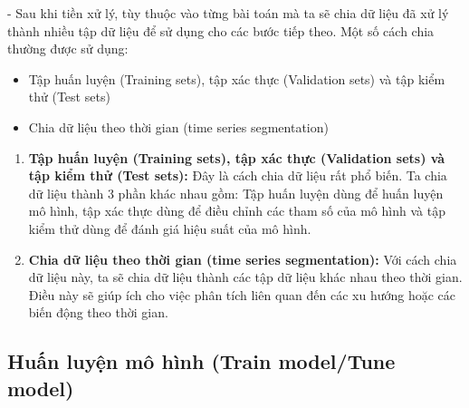 - Sau khi tiền xử lý, tùy thuộc vào từng bài toán mà ta sẽ chia dữ liệu đã xử lý thành nhiều tập dữ liệu để sử dụng cho các bước tiếp theo. Một số cách chia thường được sử dụng:
\begin{itemize}
    \item Tập huấn luyện (Training sets), tập xác thực (Validation sets) và tập kiểm thử (Test sets)
    \item Chia dữ liệu theo thời gian (time series segmentation)
\end{itemize}
\begin{enumerate}
    \item \textbf{Tập huấn luyện (Training sets), tập xác thực (Validation sets) và tập kiểm thử (Test sets):} Đây là cách chia dữ liệu rất phổ biến. Ta chia dữ liệu thành 3 phần khác nhau gồm: Tập huấn luyện dùng để huấn luyện mô hình, tập xác thực dùng để điều chỉnh các tham số của mô hình và tập kiểm thử dùng để đánh giá hiệu suất của mô hình.
    \item \textbf{Chia dữ liệu theo thời gian (time series segmentation):} Với cách chia dữ liệu này, ta sẽ chia dữ liệu thành các tập dữ liệu khác nhau theo thời gian. Điều này sẽ giúp ích cho việc phân tích liên quan đến các xu hướng hoặc các biến động theo thời gian.
\end{enumerate}
\subsection{Huấn luyện mô hình (Train model/Tune model)}
